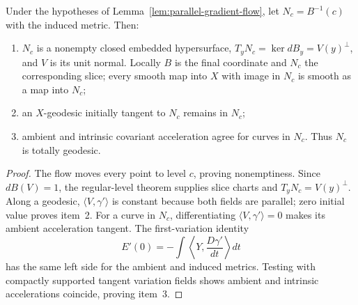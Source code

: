 \begin{lemma}
\label{lem:parallel-gradient-level-sets}



Under the hypotheses of Lemma~\ref{lem:parallel-gradient-flow}, let
$N_c=B^{-1}(c)$ with the induced metric. Then:
\begin{enumerate}
\item $N_c$ is a nonempty closed embedded hypersurface,
$T_yN_c=\ker dB_y=V(y)^\perp$, and $V$ is its unit normal. Locally
$B$ is the final coordinate and $N_c$ the corresponding slice; every
smooth map into $X$ with image in $N_c$ is smooth as a map into $N_c$;
\item an $X$-geodesic initially tangent to $N_c$ remains in $N_c$;
\item ambient and intrinsic covariant acceleration agree for curves in
$N_c$. Thus $N_c$ is totally geodesic.
\end{enumerate}
\end{lemma}
\begin{proof}
\sketch
{}
The flow moves every point to level $c$, proving nonemptiness. Since
$dB(V)=1$, the regular-level theorem supplies slice charts and
$T_yN_c=V(y)^\perp$. Along a geodesic,
$\langle V,\gamma'\rangle$ is constant because both fields are parallel;
zero initial value proves item~2. For a curve in $N_c$, differentiating
$\langle V,\gamma'\rangle=0$ makes its ambient acceleration tangent.
The first-variation identity
$$E'(0)=-\int\left\langle Y,\frac{D\gamma'}{dt}\right\rangle dt$$
has the same left side for the ambient and induced metrics. Testing with
compactly supported tangent variation fields shows ambient and intrinsic
accelerations coincide, proving item~3.
\end{proof}

